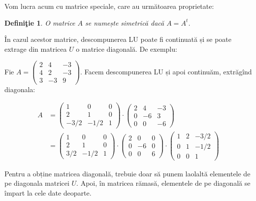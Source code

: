 \documentclass[11pt,a4paper]{article}
\theoremstyle{dotless}
\theoremstyle{dotlessdr}
\newtheorem{definition}{Defini\c{t}ie}[section]
\begin{document}
  \indent\indent Vom lucra acum cu matrice speciale, care au următoarea proprietate:

  \begin{definition}\label{def:mat-sim}
    O matrice $A$ se numește \emph{simetrică} dacă $A = A^t$.
  \end{definition}

  În cazul acestor matrice, descompunerea LU poate fi continuată și se poate
  extrage din matricea $U$ o matrice diagonală. De exemplu:

  Fie $A = \begin{pmatrix}
    2 & 4 & -3 \\
    4 & 2 & -3 \\
    3 & -3 & 9
  \end{pmatrix}$. Facem descompunerea LU și apoi continuăm, extrăgînd diagonala:

  \begin{align*}
    A &= \begin{pmatrix}
      1 & 0 & 0 \\
      2 & 1 & 0 \\
      -3/2 & -1/2 & 1
    \end{pmatrix} \cdot 
    \begin{pmatrix}
      2 & 4 & -3 \\
      0 & -6 & 3 \\
      0 & 0 & -6
    \end{pmatrix} \\
    &= \begin{pmatrix}
    1 & 0 & 0 \\
    2 & 1 & 0 \\
    3/2 & -1/2 & 1
  \end{pmatrix} \cdot
  \begin{pmatrix}
    2 & 0 & 0 \\
    0 & -6 & 0 \\
    0 & 0 & 6
  \end{pmatrix} \cdot
  \begin{pmatrix}
    1 & 2 & -3/2 \\
    0 & 1 & -1/2 \\
    0 & 0 & 1
  \end{pmatrix}
\end{align*}

Pentru a obține matricea diagonală, trebuie doar să punem laolaltă elementele
de pe diagonala matricei $U$. Apoi, în matricea rămasă, elementele de pe diagonală
se împart la cele date deoparte.
\end{document}
